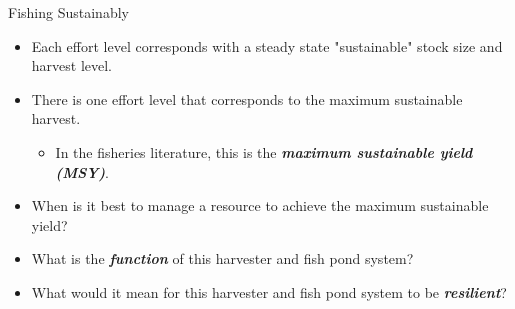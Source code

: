 \begin{frame}{Fishing Sustainably}
	\begin{itemize}
		\item Each effort level corresponds with a steady state "sustainable" stock size and harvest level.
		\item There is one effort level that corresponds to the maximum sustainable harvest.
		\begin{itemize}
			\item In the fisheries literature, this is the \textit{\textbf{maximum sustainable yield (MSY)}}.
		\end{itemize}
		\item When is it best to manage a resource to achieve the maximum sustainable yield?
		\item What is the \textit{\textbf{function}} of this harvester and fish pond system?
		\item What would it mean for this harvester and fish pond system to be \textit{\textbf{resilient}}?
	\end{itemize}
\end{frame}

